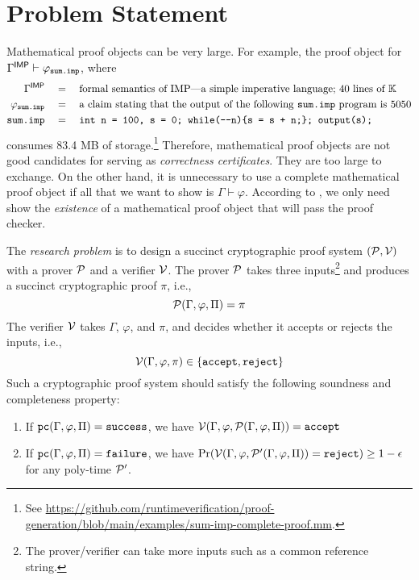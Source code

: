\documentclass{article}
\begin{document}
\section{Problem Statement}
\label{sec:crypto_proofs}

Mathematical proof objects can be very large.
For example, the proof object for
$\Gamma^{\mathsf{IMP}} \vdash \varphi_{\textnormal{\texttt{sum.imp}}}$,
where
\begin{align}
\GammaIMP &\quad=\quad 
\text{formal semantics of IMP---a simple imperative language; 40 lines of \K}
\\
\varphisum &\quad=\quad 
\text{a claim stating that the output of the following \cdsum program is 5050}
\\
\cdsum &\quad=\quad 
\code{int n = 100, s = 0; while(-{}-n)\{s = s + n;\}; output(s);}
\end{align}
consumes 83.4 MB of storage.\footnote{See \url{https://github.com/runtimeverification/proof-generation/blob/main/examples/sum-imp-complete-proof.mm}.}
Therefore, mathematical proof objects are not good candidates for
serving as \emph{correctness certificates}.
They are too large to exchange. 
On the other hand, 
it is unnecessary to use a complete mathematical proof object
if all that we want to show is $\Gamma \vdash \varphi$.
According to ,
we only need show the \emph{existence} of a mathematical proof object
that will pass the proof checker. 

The \emph{research problem} is to 
design a succinct cryptographic proof system
$(\mathcal{P},\mathcal{V})$
with a prover $\mathcal{P}$ and a verifier $\mathcal{V}$.
The prover $\mathcal{P}$ takes three inputs\footnote{The prover/verifier can take more inputs such as a common reference string.}
and produces a succinct cryptographic proof $\pi$, i.e., 
\begin{equation}
\mathcal{P}(\Gamma, \varphi, \Pi) = \pi
\end{equation}
The verifier $\mathcal{V}$ takes $\Gamma$, $\varphi$, and $\pi$,
and decides whether it accepts or rejects the inputs, i.e.,
\begin{equation}
\mathcal{V}(\Gamma, \varphi, \pi) \in \{\textnormal{\texttt{accept}}, \textnormal{\texttt{reject}}\}
\end{equation}
Such a cryptographic proof system should satisfy the following soundness and completeness property:
\begin{enumerate}
\item If $\textnormal{\texttt{pc}}(\Gamma,\varphi,\Pi) = \textnormal{\texttt{success}}$, we have $\mathcal{V}(\Gamma,\varphi,\mathcal{P}(\Gamma, \varphi, \Pi)) = \textnormal{\texttt{accept}}$
\item If $\textnormal{\texttt{pc}}(\Gamma,\varphi,\Pi) = \textnormal{\texttt{failure}}$, we have
$\Pr(\mathcal{V}(\Gamma, \varphi, \mathcal{P}'(\Gamma, \varphi, \Pi)) = \textnormal{\texttt{reject}}) \ge 1-\epsilon$
for any poly-time $\mathcal{P}'$. 
\end{enumerate}
\end{document}
